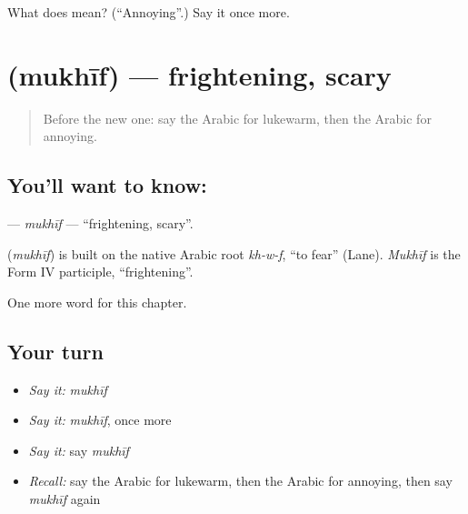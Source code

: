 \begin{tcolorbox}[breakable,colback=teal!4,colframe=teal!35!black,title={Before you move on}]
What does  mean? (\textquotedblleft{}Annoying\textquotedblright{}.) Say it once more.
\end{tcolorbox}
\section[\texorpdfstring{\ar{مخيف} (mukhīf)}{مخيف (mukhīf)}]{ (mukhīf) — frightening, scary}

\label{lesson:AR-C243-mukhif}



\begin{quote}
Before the new one: say the Arabic for lukewarm, then the Arabic for annoying.
\end{quote}

\subsection*{You'll want to know: }
\textbf{} — \emph{mukhīf} — \textquotedblleft{}frightening, scary\textquotedblright{}.

\begin{cousinweb}
\textbf{} (\emph{mukhīf}) is built on the native Arabic root \emph{kh-w-f}, \textquotedblleft{}to fear\textquotedblright{} (Lane). \emph{Mukhīf} is the Form IV participle, \textquotedblleft{}frightening\textquotedblright{}.
\end{cousinweb}

\begin{grammarlens}[title={What you've built}]
One more word for this chapter.
\end{grammarlens}

\subsection*{Your turn}
\begin{itemize}
\raggedright
  \item \emph{Say it:} \emph{mukhīf}
  \item \emph{Say it:} \emph{mukhīf}, once more
  \item \emph{Say it:} say \emph{mukhīf}
  \item \emph{Recall:} say the Arabic for lukewarm, then the Arabic for annoying, then say \emph{mukhīf} again
\end{itemize}

